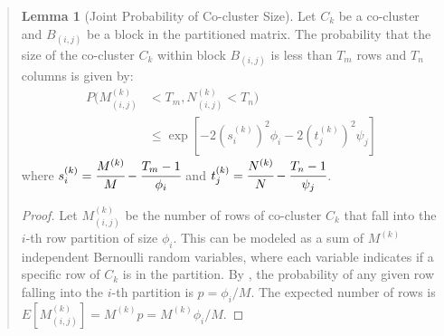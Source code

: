 \documentclass{ar2rc}
\theoremstyle{definition}
\newtheorem*{lemma*}{Lemma}
\theoremstyle{remark} %
\begin{document}
\begin{quote}
  \begin{lemma*}[Joint Probability of Co-cluster Size]
    Let $C_k$ be a co-cluster and $B_{(i,j)}$ be a block in the partitioned matrix. The probability that the size of the co-cluster $C_k$ within block $B_{(i,j)}$ is less than $T_m$ rows and $T_n$ columns is given by:
    \begin{equation}
      \begin{aligned}
        P(M_{(i,j)}^{(k)} & < T_m, N_{(i,j)}^{(k)} < T_n)                                         \\
                          & \leq \exp\left[-2 (s_i^{(k)})^2 \phi_i -2 (t_j^{(k)})^2 \psi_j\right]
      \end{aligned}
    \end{equation}
    where $s_i^{(k)} = \cfrac{M^{(k)}}{M} - \cfrac{T_m-1}{\phi_i}$ and $t_j^{(k)} = \cfrac{N^{(k)}}{N} - \cfrac{T_n-1}{\psi_j}$.
  \end{lemma*}


  \begin{proof}
    Let $M_{(i,j)}^{(k)}$ be the number of rows of co-cluster $C_k$ that fall into the $i$-th row partition of size $\phi_i$. This can be modeled as a sum of $M^{(k)}$ independent Bernoulli random variables, where each variable indicates if a specific row of $C_k$ is in the partition. By , the probability of any given row falling into the $i$-th partition is $p = \phi_i / M$. The expected number of rows is $E[M_{(i,j)}^{(k)}] = M^{(k)} p = M^{(k)} \phi_i / M$.


\end{proof}
\end{quote}
\end{document}
